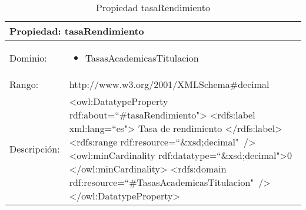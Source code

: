 \begin{table}[!ht]
	\centering
	\begin{tabular}{|p{}|p{}|}
		\hline
		\multicolumn{2}{|l|}{Propiedad: \textbf{tasaRendimiento}}
		\\ \hline
		Dominio:&
		\begin{itemize}
			\item TasasAcademicasTitulacion
		\end{itemize}
		\\ \hline
		Rango:&
		http://www.w3.org/2001/XMLSchema\#decimal
		\\ \hline
		Descripción:&
		\textless owl:DatatypeProperty rdf:about=``\#tasaRendimiento"\textgreater\newline 
		\tab\textless rdfs:label xml:lang=``es"\textgreater\newline
		\tab\tab Tasa de rendimiento\newline
		\tab\textless /rdfs:label\textgreater\newline
		\tab\textless rdfs:range\newline
		\tab\tab rdf:resource=``\&xsd;decimal"\ /\textgreater\newline
		\tab\textless owl:minCardinality \newline
		\tab\tab rdf:datatype=``\&xsd;decimal"\textgreater0\newline
		\tab\textless /owl:minCardinality\textgreater\newline
		\tab\textless rdfs:domain\newline
		\tab\tab rdf:resource=``\#TasasAcademicasTitulacion"\ /\textgreater\newline
		\textless /owl:DatatypeProperty\textgreater
		\\ \hline
	\end{tabular}
	\caption{Propiedad tasaRendimiento}
	\label{propiedad-tasarendimiento}
\end{table}

